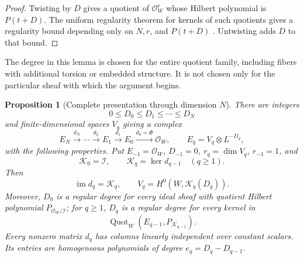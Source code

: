 \documentclass[11pt,reqno]{amsart}
\numberwithin{equation}{section}
\newtheorem{proposition}[theorem]{Proposition}
\theoremstyle{definition}
\theoremstyle{remark}
\begin{document}
\begin{proof}
Twisting by \(D\) gives a quotient of \(\mathcal O_W^r\) whose Hilbert
polynomial is \(P(t+D)\). The uniform regularity theorem for kernels of
such quotients gives a regularity bound depending only on \(N,r\), and
\(P(t+D)\) \cite[Tag 08AG]{StacksRegularity}. Untwisting adds \(D\) to
that bound.
\end{proof}

The degree in this lemma is chosen for the entire quotient family,
including fibers with additional torsion or embedded structure. It is
not chosen only for the particular sheaf with which the argument begins.

\begin{proposition}[Complete presentation through dimension \(N\)]
\label{alg:complete}
There are integers
\[
 0\leq D_0\leq D_1\leq\cdots\leq D_N
\]
and finite-dimensional spaces \(V_q\) giving a complex
\begin{equation}
 E_N\xrightarrow{d_N}\cdots\xrightarrow{d_2}E_1
 \xrightarrow{d_1}E_0\xrightarrow{d_0=\Phi}\mathcal O_W,
 \qquad E_q=V_q\otimes L^{-D_q},
 \label{alg:complex}
\end{equation}
with the following properties. Put \(E_{-1}=\mathcal O_W\),
\(D_{-1}=0\), \(r_q=\dim V_q\), \(r_{-1}=1\), and
\[
 \mathscr K_0=\mathscr I,\qquad
 \mathscr K_q=\ker d_{q-1}\quad(q\geq1).
\]
Then
\[
 \operatorname{im}d_q=\mathscr K_q,
 \qquad
 V_q=H^0(W,\mathscr K_q(D_q)).
 \tag{\(\ast\)}
\]
Moreover, \(D_0\) is a regular degree for every ideal sheaf with quotient
Hilbert polynomial \(P_{\mathcal O_W/\mathscr I}\); for \(q\geq1\),
\(D_q\) is a regular degree for every kernel in
\[
 \operatorname{Quot}_{W}(E_{q-1},P_{\mathscr K_{q-1}}).
 \tag{\(\ast\ast\)}
\]
Every nonzero matrix \(d_q\) has columns linearly independent over
constant scalars. Its entries are homogeneous polynomials of degree
\(e_q=D_q-D_{q-1}\).
\end{proposition}
\end{document}
